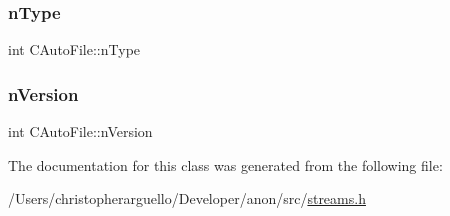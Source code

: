 \mbox{\label{class_c_auto_file_a39ca705ff45e36a05acd5df3c4114aef}} 
\subsubsection{\texorpdfstring{n\+Type}{nType}}
{\footnotesize\ttfamily int C\+Auto\+File\+::n\+Type\hspace{0.3cm}{\ttfamily [private]}}

\mbox{\label{class_c_auto_file_a23fb456ee23003aebc3c58ab3fd683c1}} 
\subsubsection{\texorpdfstring{n\+Version}{nVersion}}
{\footnotesize\ttfamily int C\+Auto\+File\+::n\+Version\hspace{0.3cm}{\ttfamily [private]}}



The documentation for this class was generated from the following file\+:\begin{DoxyCompactItemize}
\item 
/\+Users/christopherarguello/\+Developer/anon/src/\mbox{\hyperlink{streams_8h}{streams.\+h}}\end{DoxyCompactItemize}
